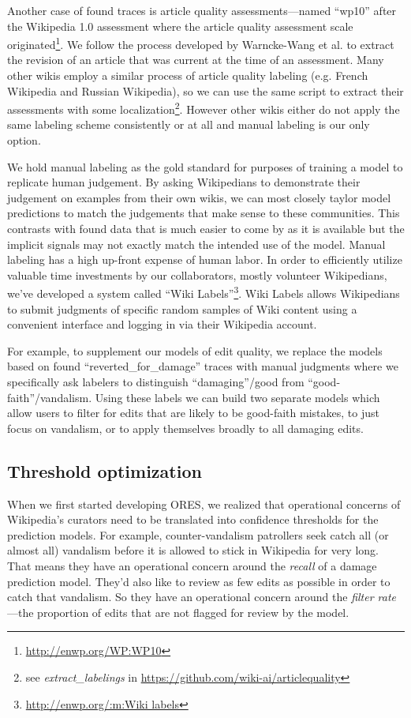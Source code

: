 Another case of found traces is article quality assessments---named ``wp10'' after the Wikipedia 1.0 assessment where the article quality assessment scale originated\footnote{\url{http://enwp.org/WP:WP10}}.  We follow the process developed by Warncke-Wang et al.\cite{wang2017english} to extract the revision of an article that was current at the time of an assessment.  Many other wikis employ a similar process of article quality labeling (e.g. French Wikipedia and Russian Wikipedia), so we can use the same script to extract their assessments with some localization\footnote{see \emph{extract\_labelings} in \url{https://github.com/wiki-ai/articlequality}}.  However other wikis either do not apply the same labeling scheme consistently or at all and manual labeling is our only option.

%
We hold manual labeling as the gold standard for purposes of training a model to replicate human judgement.  By asking Wikipedians to demonstrate their judgement on examples from their own wikis, we can most closely taylor model predictions to match the judgements that make sense to these communities.  This contrasts with found data that is much easier to come by as it is available but the implicit signals may not exactly match the intended use of the model.  Manual labeling has a high up-front expense of human labor.  In order to efficiently utilize valuable time investments by our collaborators, mostly volunteer Wikipedians, we've developed a system called ``Wiki Labels''\footnote{\url{http://enwp.org/:m:Wiki labels}}.  Wiki Labels allows Wikipedians to submit judgments of specific random samples of Wiki content using a convenient interface and logging in via their Wikipedia account.

For example, to supplement our models of edit quality, we replace the models based on found ``reverted\_for\_damage'' traces with manual judgments where we specifically ask labelers to distinguish ``damaging''/good from ``good-faith''/vandalism.  Using these labels we can build two separate models which allow users to filter for edits that are likely to be good-faith mistakes\cite{halfaker2017automated}, to just focus on vandalism, or to apply themselves broadly to all damaging edits.

\subsection{Threshold optimization}
When we first started developing ORES, we realized that operational concerns of Wikipedia's curators need to be translated into confidence thresholds for the prediction models.  For example, counter-vandalism patrollers seek catch all (or almost all) vandalism before it is allowed to stick in Wikipedia for very long.  That means they have an operational concern around the \emph{recall} of a damage prediction model.  They'd also like to review as few edits as possible in order to catch that vandalism.  So they have an operational concern around the \emph{filter rate}---the proportion of edits that are not flagged for review by the model\cite{halfaker2016notes}.

